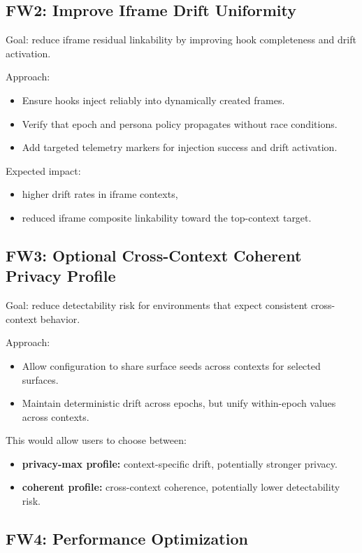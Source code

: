 \documentclass[11pt]{report}
\begin{document}
\subsection{FW2: Improve Iframe Drift Uniformity}

Goal: reduce iframe residual linkability by improving hook completeness and drift activation.

Approach:
\begin{itemize}
    \item Ensure hooks inject reliably into dynamically created frames.
    \item Verify that epoch and persona policy propagates without race conditions.
    \item Add targeted telemetry markers for injection success and drift activation.
\end{itemize}

Expected impact:
\begin{itemize}
    \item higher drift rates in iframe contexts,
    \item reduced iframe composite linkability toward the top-context target.
\end{itemize}

\subsection{FW3: Optional Cross-Context Coherent Privacy Profile}

Goal: reduce detectability risk for environments that expect consistent cross-context behavior.

Approach:
\begin{itemize}
    \item Allow configuration to share surface seeds across contexts for selected surfaces.
    \item Maintain deterministic drift across epochs, but unify within-epoch values across contexts.
\end{itemize}

This would allow users to choose between:
\begin{itemize}
    \item \textbf{privacy-max profile:} context-specific drift, potentially stronger privacy.
    \item \textbf{coherent profile:} cross-context coherence, potentially lower detectability risk.
\end{itemize}

\subsection{FW4: Performance Optimization}
\end{document}

